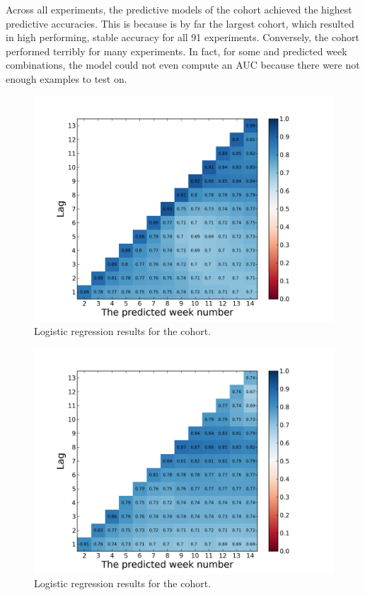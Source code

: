Across all experiments, the predictive models of the \neither cohort achieved the highest predictive accuracies. This is because \neither is by far the largest cohort, which resulted in high performing, stable accuracy for all 91 experiments. Conversely, the \wiki cohort performed terribly for many experiments. In fact, for some \lag and predicted week combinations, the model could not even compute an AUC because there were not enough examples to test on.

\begin{figure}[ht!]
  \caption{Logistic regression results for the \neither cohort.}\label{fig:logistic_regression_heatmap_no_collab}
  \centering
    \includegraphics[width=1.0\textwidth]{figures/logreg/no_collab.png}
\end{figure}

\begin{figure}[ht!]
  \caption{Logistic regression results for the \forum cohort.}\label{fig:logistic_regression_heatmap_forum_only}
  \centering
    \includegraphics[width=1.0\textwidth]{figures/logreg/forum_only.png}
\end{figure}

